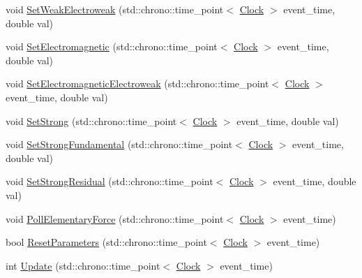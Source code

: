 \begin{DoxyCompactItemize}
void \mbox{\hyperlink{classElementaryForce_a38d4f86f18a9f84a4198ee43bc90f6b4}{Set\+Weak\+Electroweak}} (std\+::chrono\+::time\+\_\+point$<$ \mbox{\hyperlink{universe_8h_a0ef8d951d1ca5ab3cfaf7ab4c7a6fd80}{Clock}} $>$ event\+\_\+time, double val)
\item 
void \mbox{\hyperlink{classElementaryForce_a67f6845bd715c29c17387d291b343a1b}{Set\+Electromagnetic}} (std\+::chrono\+::time\+\_\+point$<$ \mbox{\hyperlink{universe_8h_a0ef8d951d1ca5ab3cfaf7ab4c7a6fd80}{Clock}} $>$ event\+\_\+time, double val)
\item 
void \mbox{\hyperlink{classElementaryForce_af4f12038c33d7edf9f13339fcd632ec9}{Set\+Electromagnetic\+Electroweak}} (std\+::chrono\+::time\+\_\+point$<$ \mbox{\hyperlink{universe_8h_a0ef8d951d1ca5ab3cfaf7ab4c7a6fd80}{Clock}} $>$ event\+\_\+time, double val)
\item 
void \mbox{\hyperlink{classElementaryForce_aa1b5708cfab2069049fec5c924e1f246}{Set\+Strong}} (std\+::chrono\+::time\+\_\+point$<$ \mbox{\hyperlink{universe_8h_a0ef8d951d1ca5ab3cfaf7ab4c7a6fd80}{Clock}} $>$ event\+\_\+time, double val)
\item 
void \mbox{\hyperlink{classElementaryForce_afb00e9a10ec33eeb1daefce39b0468b7}{Set\+Strong\+Fundamental}} (std\+::chrono\+::time\+\_\+point$<$ \mbox{\hyperlink{universe_8h_a0ef8d951d1ca5ab3cfaf7ab4c7a6fd80}{Clock}} $>$ event\+\_\+time, double val)
\item 
void \mbox{\hyperlink{classElementaryForce_ac25021d38c1d54bf711096ab37a461f6}{Set\+Strong\+Residual}} (std\+::chrono\+::time\+\_\+point$<$ \mbox{\hyperlink{universe_8h_a0ef8d951d1ca5ab3cfaf7ab4c7a6fd80}{Clock}} $>$ event\+\_\+time, double val)
\item 
void \mbox{\hyperlink{classElementaryForce_aa5ab479744dbf3e8578f8d2974299ff7}{Poll\+Elementary\+Force}} (std\+::chrono\+::time\+\_\+point$<$ \mbox{\hyperlink{universe_8h_a0ef8d951d1ca5ab3cfaf7ab4c7a6fd80}{Clock}} $>$ event\+\_\+time)
\item 
bool \mbox{\hyperlink{classElementaryForce_a1dedcd23a538b87f71ecd43cb36a6db5}{Reset\+Parameters}} (std\+::chrono\+::time\+\_\+point$<$ \mbox{\hyperlink{universe_8h_a0ef8d951d1ca5ab3cfaf7ab4c7a6fd80}{Clock}} $>$ event\+\_\+time)
\item 
int \mbox{\hyperlink{classElementaryForce_a855c26eb8a542ff633af66940da5f90b}{Update}} (std\+::chrono\+::time\+\_\+point$<$ \mbox{\hyperlink{universe_8h_a0ef8d951d1ca5ab3cfaf7ab4c7a6fd80}{Clock}} $>$ event\+\_\+time)
\end{DoxyCompactItemize}
